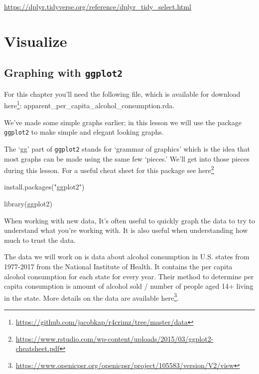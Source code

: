 \documentclass[
]{krantz}
\makeatletter
\newenvironment{Shaded}{\begin{snugshade}}{\end{snugshade}}
\newcommand{\FunctionTok}[1]{\textcolor[rgb]{0,0,0}{#1}}
\newcommand{\NormalTok}[1]{#1}
\newcommand{\StringTok}[1]{\textcolor[rgb]{0.5,0.5,0.5}{#1}}
\renewcommand{\href}[2]{#2\footnote{\url{#1}}}
\newenvironment{kframe}{%
\medskip{}
\setlength{\fboxsep}{.8em}
 \def\at@end@of@kframe{}%
 \ifinner\ifhmode%
  \def\at@end@of@kframe{\end{minipage}}%
  \begin{minipage}{\columnwidth}%
 \fi\fi%
 \def\FrameCommand##1{\hskip\@totalleftmargin \hskip-\fboxsep
 \colorbox{shadecolor}{##1}\hskip-\fboxsep
     \hskip-\linewidth \hskip-\@totalleftmargin \hskip\columnwidth}%
 \MakeFramed {\advance\hsize-\width
   \@totalleftmargin\z@ \linewidth\hsize
   \@setminipage}}%
 {\par\unskip\endMakeFramed%
 \at@end@of@kframe}
\renewenvironment{Shaded}{\begin{kframe}}{\end{kframe}}
\makeatother
\begin{document}
\url{https://dplyr.tidyverse.org/reference/dplyr_tidy_select.html}

\hypertarget{part-visualize}{%
\part{Visualize}\label{part-visualize}}

\hypertarget{graphing-intro}{%
\chapter{\texorpdfstring{Graphing with \texttt{ggplot2}}{Graphing with ggplot2}}\label{graphing-intro}}

For this chapter you'll need the following file, which is available for download \href{https://github.com/jacobkap/r4crimz/tree/master/data}{here}: apparent\_per\_capita\_alcohol\_consumption.rda.

We've made some simple graphs earlier; in this lesson we will use the package \texttt{ggplot2} to make simple and elegant looking graphs.

The `gg' part of \texttt{ggplot2} stands for `grammar of graphics' which is the idea that most graphs can be made using the same few `pieces.' We'll get into those pieces during this lesson. For a useful cheat sheet for this package see \href{https://www.rstudio.com/wp-content/uploads/2015/03/ggplot2-cheatsheet.pdf}{here}

\begin{Shaded}
\begin{Highlighting}[]
\FunctionTok{install.packages}\NormalTok{(}\StringTok{"ggplot2"}\NormalTok{)}
\end{Highlighting}
\end{Shaded}

\begin{Shaded}
\begin{Highlighting}[]
\FunctionTok{library}\NormalTok{(ggplot2)}
\end{Highlighting}
\end{Shaded}

When working with new data, It's often useful to quickly graph the data to try to understand what you're working with. It is also useful when understanding how much to trust the data.

The data we will work on is data about alcohol consumption in U.S. states from 1977-2017 from the National Institute of Health. It contains the per capita alcohol consumption for each state for every year. Their method to determine per capita consumption is amount of alcohol sold / number of people aged 14+ living in the state. More details on the data are available \href{https://www.openicpsr.org/openicpsr/project/105583/version/V2/view}{here}.
\end{document}
